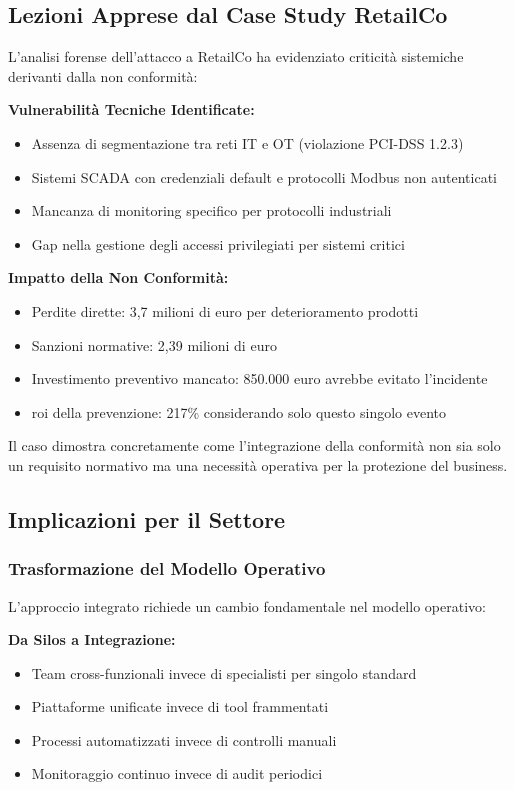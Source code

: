 \subsection{Lezioni Apprese dal Case Study RetailCo}

L'analisi forense dell'attacco a RetailCo ha evidenziato criticità sistemiche derivanti dalla non conformità:

\textbf{Vulnerabilità Tecniche Identificate:}
\begin{itemize}
    \item Assenza di segmentazione tra reti IT e OT (violazione PCI-DSS 1.2.3)
    \item Sistemi SCADA con credenziali default e protocolli Modbus non autenticati
    \item Mancanza di monitoring specifico per protocolli industriali
    \item Gap nella gestione degli accessi privilegiati per sistemi critici
\end{itemize}

\textbf{Impatto della Non Conformità:}
\begin{itemize}
    \item Perdite dirette: 3,7 milioni di euro per deterioramento prodotti
    \item Sanzioni normative: 2,39 milioni di euro
    \item Investimento preventivo mancato: 850.000 euro avrebbe evitato l'incidente
    \item \gls{roi} della prevenzione: 217\% considerando solo questo singolo evento
\end{itemize}

Il caso dimostra concretamente come l'integrazione della conformità non sia solo un requisito normativo ma una necessità operativa per la protezione del business.

\subsection{Implicazioni per il Settore}

\subsubsection{Trasformazione del Modello Operativo}

L'approccio integrato richiede un cambio fondamentale nel modello operativo:

\textbf{Da Silos a Integrazione:}
\begin{itemize}
    \item Team cross-funzionali invece di specialisti per singolo standard
    \item Piattaforme unificate invece di tool frammentati
    \item Processi automatizzati invece di controlli manuali
    \item Monitoraggio continuo invece di audit periodici
\end{itemize}

